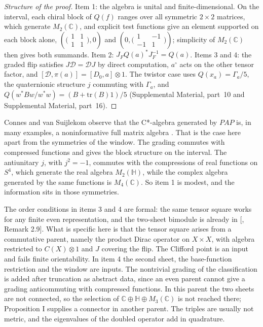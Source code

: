 \documentclass[aps,prd,reprint,onecolumn,nofootinbib,amsmath,amssymb,floatfix]{revtex4-2}
\theoremstyle{plain}
\newcommand{\supp}[1]{Supplemental Material, part~#1}
\newcommand{\C}{\mathbb C}
\renewcommand{\H}{\mathbb H}
\begin{document}
\begin{proof}[Structure of the proof]
Item 1: the algebra is unital and finite-dimensional. On the interval, each chiral block of $Q(f)$ ranges over all symmetric $2\times2$ matrices, which generate $M_2(\C)$, and explicit test functions give an element supported on each block alone, $(\bigl(\begin{smallmatrix}1&1\\1&1\end{smallmatrix}\bigr),0)$ and $(0,\bigl(\begin{smallmatrix}1&-1\\-1&1\end{smallmatrix}\bigr))$; simplicity of $M_2(\C)$ then gives both summands. Item 2: $J_FQ(a)^*J_F^{-1}=Q(a)$. Items 3 and 4: the graded flip satisfies $J\mathcal D=\mathcal DJ$ by direct computation, $a^\circ$ acts on the other tensor factor, and $[\mathcal D,\pi(a)]=[D_0,a]\otimes1$. The twistor case uses $Q(x_a)=\Gamma_a/5$, the quaternionic structure $j$ commuting with $\Gamma_a$, and $Q(w^*Bw/w^*w)=(B+\mathrm{tr}(B)1)/5$ (\supp{10} and \supp{16}).
\end{proof}

Connes and van Suijlekom observe that the C*-algebra generated by $PAP$ is, in many examples, a noninformative full matrix algebra \cite{CvS2021}. That is the case here apart from the symmetries of the window. The grading commutes with compressed functions and gives the block structure on the interval. The antiunitary $j$, with $j^2=-1$, commutes with the compressions of real functions on $S^4$, which generate the real algebra $M_2(\H)$, while the complex algebra generated by the same functions is $M_4(\C)$. So item 1 is modest, and the information sits in those symmetries.

The order conditions in items 3 and 4 are formal: the same tensor square works for any finite even representation, and the two-sheet bimodule is already in [, Remark 2.9]. What is specific here is that the tensor square arises from a commutative parent, namely the product Dirac operator on $X\times X$, with algebra restricted to $C(X)\otimes1$ and $J$ covering the flip. The Clifford point is an input and fails finite orientability. In item 4 the second sheet, the base-function restriction and the window are inputs. The nontrivial grading of the classification is added after truncation as abstract data, since an even parent cannot give a grading anticommuting with compressed functions. In this parent the two sheets are not connected, so the selection of $\C\oplus\H\oplus M_3(\C)$ is not reached there; Proposition I supplies a connector in another parent. The triples are usually not metric, and the eigenvalues of the doubled operator add in quadrature.
\end{document}
